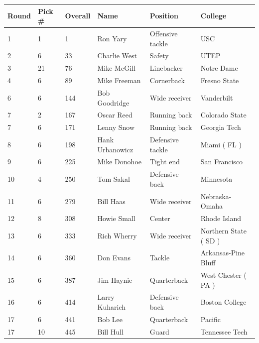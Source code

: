 \documentclass{article}
\begin{document}
\begin{tabular}{llllll}
\toprule
Round & Pick \# & Overall & Name & Position & College \\
\midrule
1 & 1 & 1 & Ron Yary & Offensive tackle & USC \\
2 & 6 & 33 & Charlie West & Safety & UTEP \\
3 & 21 & 76 & Mike McGill & Linebacker & Notre Dame \\
4 & 6 & 89 & Mike Freeman & Cornerback & Fresno State \\
6 & 6 & 144 & Bob Goodridge & Wide receiver & Vanderbilt \\
7 & 2 & 167 & Oscar Reed & Running back & Colorado State \\
7 & 6 & 171 & Lenny Snow & Running back & Georgia Tech \\
8 & 6 & 198 & Hank Urbanowicz & Defensive tackle & Miami ( FL ) \\
9 & 6 & 225 & Mike Donohoe & Tight end & San Francisco \\
10 & 4 & 250 & Tom Sakal & Defensive back & Minnesota \\
11 & 6 & 279 & Bill Haas & Wide receiver & Nebraska-Omaha \\
12 & 8 & 308 & Howie Small & Center & Rhode Island \\
13 & 6 & 333 & Rich Wherry & Wide receiver & Northern State ( SD ) \\
14 & 6 & 360 & Don Evans & Tackle & Arkansas-Pine Bluff \\
15 & 6 & 387 & Jim Haynie & Quarterback & West Chester ( PA ) \\
16 & 6 & 414 & Larry Kuharich & Defensive back & Boston College \\
17 & 6 & 441 & Bob Lee & Quarterback & Pacific \\
17 & 10 & 445 & Bill Hull & Guard & Tennessee Tech \\
\bottomrule
\end{tabular}
\end{document}
